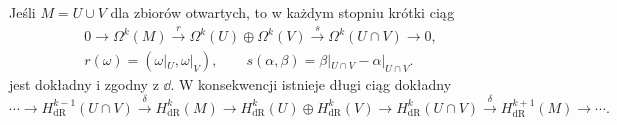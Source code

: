 \begin{twierdzenie}
\label{thm:mv-de-rham}
Jeśli $M=U\cup V$ dla zbiorów otwartych, to
w każdym stopniu krótki ciąg
\begin{equation}\label{eq:mv-formy-kompleks}
\begin{gathered}
0\to\Omega^k(M)\xrightarrow{\ r\ }
\Omega^k(U)\oplus\Omega^k(V)
\xrightarrow{\ s\ }\Omega^k(U\cap V)\to0,\\
r(\omega)=(\omega|_U,\omega|_V),\qquad
s(\alpha,\beta)=\beta|_{U\cap V}-\alpha|_{U\cap V}.
\end{gathered}
\end{equation}
jest dokładny i zgodny z $\dd$. W konsekwencji
istnieje długi ciąg dokładny
\[
 \cdots\to H^{k-1}_{\mathrm{dR}}(U\cap V)
 \xrightarrow{\delta}H^k_{\mathrm{dR}}(M)
 \to H^k_{\mathrm{dR}}(U)\oplus H^k_{\mathrm{dR}}(V)
 \to H^k_{\mathrm{dR}}(U\cap V)
 \xrightarrow{\delta}H^{k+1}_{\mathrm{dR}}(M)\to\cdots.
\]
\end{twierdzenie}
